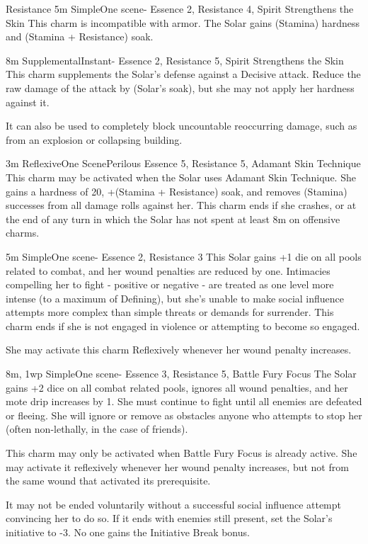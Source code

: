 \begin{Ability}{Resistance}
  {5m}
  {Simple}{One scene}{-}
  {Essence 2, Resistance 4, Spirit Strengthens the Skin}
  This charm is incompatible with armor. The Solar gains (Stamina) hardness and (Stamina + Resistance) soak.

  {8m}
  {Supplemental}{Instant}{-}
  {Essence 2, Resistance 5, Spirit Strengthens the Skin}
  This charm supplements the Solar's defense against a Decisive attack. Reduce the raw damage of the attack by (Solar's soak), but she may not apply her hardness against it.

  It can also be used to completely block uncountable reoccurring damage, such as from an explosion or collapsing building.

  {3m}
  {Reflexive}{One Scene}{Perilous}
  {Essence 5, Resistance 5, Adamant Skin Technique}
  This charm may be activated when the Solar uses Adamant Skin Technique. She gains a hardness of 20, +(Stamina + Resistance) soak, and removes (Stamina) successes from all damage rolls against her. This charm ends if she crashes, or at the end of any turn in which the Solar has not spent at least 8m on offensive charms.

  {5m}
  {Simple}{One scene}{-}
  {Essence 2, Resistance 3}
  This Solar gains +1 die on all pools related to combat, and her wound penalties are reduced by one. Intimacies compelling her to fight - positive or negative - are treated as one level more intense (to a maximum of Defining), but she's unable to make social influence attempts more complex than simple threats or demands for surrender. This charm ends if she is not engaged in violence or attempting to become so engaged.

  She may activate this charm Reflexively whenever her wound penalty increases.

  {8m, 1wp}
  {Simple}{One scene}{-}
  {Essence 3, Resistance 5, Battle Fury Focus}
  The Solar gains +2 dice on all combat related pools, ignores all wound penalties, and her mote drip increases by 1. She must continue to fight until all enemies are defeated or fleeing. She will ignore or remove as obstacles anyone who attempts to stop her (often non-lethally, in the case of friends).

  This charm may only be activated when Battle Fury Focus is already active. She may activate it reflexively whenever her wound penalty increases, but not from the same wound that activated its prerequisite.

  It may not be ended voluntarily without a successful social influence attempt convincing her to do so. If it ends with enemies still present, set the Solar's initiative to -3. No one gains the Initiative Break bonus.

\end{Ability}

